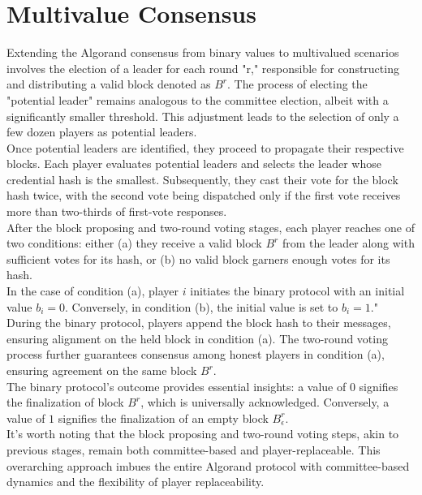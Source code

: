 \documentclass{report}
\begin{document}
\section{Multivalue Consensus}
Extending the Algorand consensus from binary values to multivalued scenarios involves the election of a leader for each round "r," responsible for constructing and distributing a valid block denoted as $B^{r}$. The process of electing the "potential leader" remains analogous to the committee election, albeit with a significantly smaller threshold. This adjustment leads to the selection of only a few dozen players as potential leaders.\\
Once potential leaders are identified, they proceed to propagate their respective blocks. Each player evaluates potential leaders and selects the leader whose credential hash is the smallest. Subsequently, they cast their vote for the block hash twice, with the second vote being dispatched only if the first vote receives more than two-thirds of first-vote responses.\\
After the block proposing and two-round voting stages, each player reaches one of two conditions: either (a) they receive a valid block $B^{r}$ from the leader along with sufficient votes for its hash, or (b) no valid block garners enough votes for its hash.\\
In the case of condition (a), player $i$ initiates the binary protocol with an initial value $b_{i} = 0$. Conversely, in condition (b), the initial value is set to $b_{i} = 1$." During the binary protocol, players append the block hash to their messages, ensuring alignment on the held block in condition (a). The two-round voting process further guarantees consensus among honest players in condition (a), ensuring agreement on the same block $B^{r}$.\\
The binary protocol's outcome provides essential insights: a value of $0$ signifies the finalization of block $B^{r}$, which is universally acknowledged. Conversely, a value of $1$ signifies the finalization of an empty block $B_\epsilon^{r}$.\\
It's worth noting that the block proposing and two-round voting steps, akin to previous stages, remain both committee-based and player-replaceable. This overarching approach imbues the entire Algorand protocol with committee-based dynamics and the flexibility of player replaceability.
\end{document}
